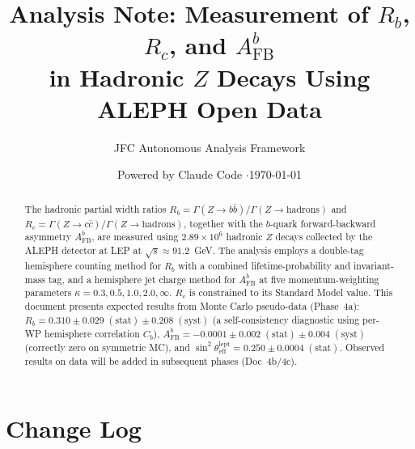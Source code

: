 \documentclass[11pt,a4paper]{article}
\title{Analysis Note: Measurement of $R_b$, $R_c$, and $A_\mathrm{FB}^b$\\
in Hadronic $Z$ Decays Using ALEPH Open Data}
\author{JFC Autonomous Analysis Framework}
\date{Powered by Claude Code \quad$\cdot$\quad \today}
\begin{document}
\maketitle

\begin{abstract}
The hadronic partial width ratios $R_b = \Gamma(Z \to b\bar{b})/\Gamma(Z \to \mathrm{hadrons})$
and $R_c = \Gamma(Z \to c\bar{c})/\Gamma(Z \to \mathrm{hadrons})$, together with the
$b$-quark forward-backward asymmetry $A_\mathrm{FB}^b$, are measured using $2.89 \times 10^6$
hadronic $Z$ decays collected by the ALEPH detector at LEP at $\sqrt{s} \approx 91.2$~GeV.
The analysis employs a double-tag hemisphere counting method for $R_b$ with a combined
lifetime-probability and invariant-mass tag, and a hemisphere jet charge method for
$A_\mathrm{FB}^b$ at five momentum-weighting parameters $\kappa = 0.3, 0.5, 1.0, 2.0, \infty$.
$R_c$ is constrained to its Standard Model value.
This document presents expected results from Monte Carlo pseudo-data (Phase~4a):
$R_b = 0.310 \pm 0.029\;\mathrm{(stat)} \pm 0.208\;\mathrm{(syst)}$
(a self-consistency diagnostic using per-WP hemisphere correlation $C_b$),
$A_\mathrm{FB}^b = -0.0001 \pm 0.002\;\mathrm{(stat)} \pm 0.004\;\mathrm{(syst)}$
(correctly zero on symmetric MC), and
$\sin^2\theta_\mathrm{eff}^\mathrm{lept} = 0.250 \pm 0.0004\;\mathrm{(stat)}$.
Observed results on data will be added in subsequent phases (Doc~4b/4c).
\end{abstract}

\tableofcontents
\clearpage

\section*{Change Log}
\end{document}
